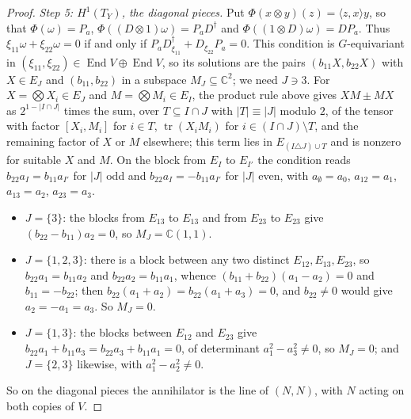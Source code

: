 \documentclass[11pt,reqno]{amsart}
\theoremstyle{plain}
\theoremstyle{definition}
\theoremstyle{remark}
\newcommand{\CC}{\mathbb{C}}
\DeclareMathOperator{\End}{End}
\begin{document}
\begin{proof}
\emph{Step 5: $H^{1}(T_{Y})$, the diagonal pieces.} Put
$\Phi(x\otimes y)(z)=\langle z,x\rangle y$, so that $\Phi(\omega)=P_{a}$,
$\Phi((D\otimes1)\omega)=P_{a}D^{\dagger}$ and $\Phi((1\otimes D)\omega)=
DP_{a}$. Thus $\xi_{11}\omega+\xi_{22}\omega=0$ if and only if
$P_{a}D_{\xi_{11}}^{\dagger}+D_{\xi_{22}}P_{a}=0$. This condition is
$G$-equivariant in $(\xi_{11},\xi_{22})\in\End V\oplus\End V$, so its solutions
are the pairs $(b_{11}X,b_{22}X)$ with $X\in E_{J}$ and $(b_{11},b_{22})$ in a
subspace $M_{J}\subseteq\CC^{2}$; we need $J\ni3$. For $X=\bigotimes X_{i}\in
E_{J}$ and $M=\bigotimes M_{i}\in E_{I}$, the product rule above gives
$XM\pm MX$ as $2^{1-|I\cap J|}$ times the sum, over $T\subseteq I\cap J$ with
$|T|\equiv|J|$ modulo $2$, of the tensor with factor $[X_{i},M_{i}]$ for
$i\in T$, $\operatorname{tr}(X_{i}M_{i})$ for $i\in(I\cap J)\setminus T$, and
the remaining factor of $X$ or $M$ elsewhere; this term lies in
$E_{(I\triangle J)\cup T}$ and is nonzero for suitable $X$ and $M$. On the
block from $E_{I}$ to $E_{I'}$ the condition reads $b_{22}a_{I}=b_{11}a_{I'}$
for $|J|$ odd and $b_{22}a_{I}=-b_{11}a_{I'}$ for $|J|$ even, with
$a_{\emptyset}=a_{0}$, $a_{12}=a_{1}$, $a_{13}=a_{2}$, $a_{23}=a_{3}$.
\begin{itemize}[leftmargin=1.6em,itemsep=1pt]
\item $J=\{3\}$: the blocks from $E_{13}$ to $E_{13}$ and from $E_{23}$ to
  $E_{23}$ give $(b_{22}-b_{11})a_{2}=0$, so $M_{J}=\CC(1,1)$.
\item $J=\{1,2,3\}$: there is a block between any two distinct
  $E_{12},E_{13},E_{23}$, so $b_{22}a_{1}=b_{11}a_{2}$ and
  $b_{22}a_{2}=b_{11}a_{1}$, whence $(b_{11}+b_{22})(a_{1}-a_{2})=0$ and
  $b_{11}=-b_{22}$; then $b_{22}(a_{1}+a_{2})=b_{22}(a_{1}+a_{3})=0$, and
  $b_{22}\ne0$ would give $a_{2}=-a_{1}=a_{3}$. So $M_{J}=0$.
\item $J=\{1,3\}$: the blocks between $E_{12}$ and $E_{23}$ give
  $b_{22}a_{1}+b_{11}a_{3}=b_{22}a_{3}+b_{11}a_{1}=0$, of determinant
  $a_{1}^{2}-a_{3}^{2}\ne0$, so $M_{J}=0$; and $J=\{2,3\}$ likewise, with
  $a_{1}^{2}-a_{2}^{2}\ne0$.
\end{itemize}
So on the diagonal pieces the annihilator is the line of $(N,N)$, with $N$
acting on both copies of $V$.


\end{proof}
\end{document}
